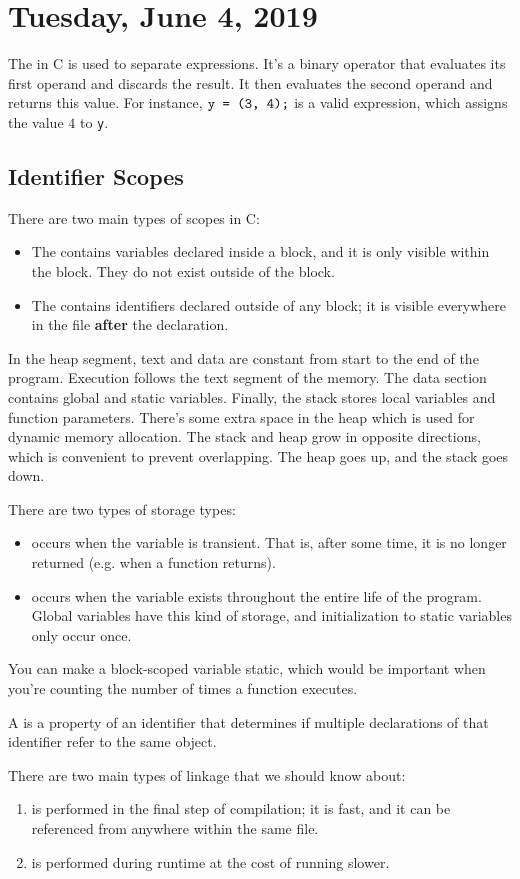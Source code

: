\section{Tuesday, June 4, 2019}
The  in C is used to separate expressions. It's a binary operator that evaluates its first operand and discards the result. It then evaluates the second operand and returns this value. For instance, $\verb!y = (3, 4);!$ is a valid expression, which assigns the value $4$ to \verb!y!. 

\subsection{Identifier Scopes}
There are two main types of scopes in C: \begin{itemize}
    \item The  contains variables declared inside a block, and it is only visible within the block. They do not exist outside of the block.
    \item The  contains identifiers declared outside of any block; it is visible everywhere in the file \textbf{after} the declaration.
\end{itemize}


In the heap segment, text and data are constant from start to the end of the program. Execution follows the text segment of the memory. The data section contains global and static variables. Finally, the stack stores local variables and function parameters. There's some extra space in the heap which is used for dynamic memory allocation. The stack and heap grow in opposite directions, which is convenient to prevent overlapping. The heap goes up, and the stack goes down.


There are two types of storage types: \begin{itemize}
    \item {} occurs when the variable is transient. That is, after some time, it is no longer returned (e.g. when a function returns).
    \item {} occurs when the variable exists throughout the entire life of the program. Global variables have this kind of storage, and initialization to static variables only occur once.
\end{itemize}
You can make a block-scoped variable static, which would be important when you're counting the number of times a function executes.



A  is a property of an identifier that determines if multiple declarations of that identifier refer to the same object.  

There are two main types of linkage that we should know about: \begin{enumerate}
    \item {} is performed in the final step of compilation; it is fast, and it can be referenced from anywhere within the same file.
    \item {} is performed during runtime at the cost of running slower.
\end{enumerate}
